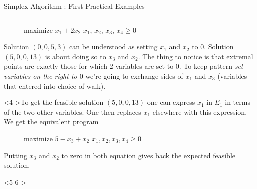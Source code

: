 \documentclass[aspectratio = 169]{beamer}
\begin{document}
\begin{frame}{Simplex Algorithm : First Practical Examples}
\begin{columns}
\begin{column}{.5\textwidth}
\begin{onlyenv}
\begin{figure}
{\begin{linearProg}{
                      maximize
                    }{
                      $x_1 + 2x_2$
                    }{
                    }{
                      $x_1$, $x_2$, $x_3$, $x_4 \geq 0$
                    }
                  \end{linearProg}
                }
              \end{figure}
              Solution $(0, 0, 5, 3)$ can be understood as setting
              $x_1$ and $x_2$ to $0$. Solution $(5, 0, 0, 13)$ is
              about doing so to $x_3$ and $x_2$. \pause The thing to
              notice is that extremal points are exactly those for
              which $2$ variables are set to $0$. \pause To keep
              pattern \textit{set variables on the right to $0$} we're
              going to exchange sides of $x_1$ and $x_3$ (variables
              that entered into choice of walk).
            \end{onlyenv}
            \begin{onlyenv}<4
              >To get the feasible solution $(5, 0, 0, 13)$ one can
              express $x_1$ in $E_1$ in terms of the two other
              variables. One then replaces $x_1$ elsewhere with this
              expression. We get the equivalent program
                \begin{figure}
                  \small{
                    \begin{linearProg}{
                        maximize
                      }{
                        $5 - x_3 + x_2$
                      }{
                      }{
                        $x_1, x_2, x_3, x_4 \geq 0$
                      }
                    \end{linearProg}
                  }
                \end{figure}
                Putting $x_3$ and $x_2$ to zero in both equation gives
                back the expected feasible solution.
            \end{onlyenv}
            \begin{onlyenv}<5-6
                >
\end{onlyenv}
\end{column}
\end{columns}
\end{frame}
\end{document}
